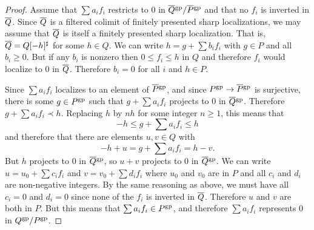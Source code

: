 \documentclass[10pt]{article}
\numberwithin{equation}{section}
\theoremstyle{definition}
\theoremstyle{remark}
\renewcommand{\bar}[1]{\overnorm{#1}\vphantom{#1}}
\def\overnorm#1{\overline{#1}\vphantom{#1}}
\begin{document}
\begin{proof}
	Assume that $\sum a_i f_i$ restricts to $0$ in $\bar Q^{\rm gp} / \bar P^{\rm gp}$ and that no $f_i$ is inverted in $\bar Q$.  Since $\bar Q$ is a filtered colimit of finitely presented sharp localizations, we may assume that $\bar Q$ is itself a finitely presented sharp localization.  That is, $\bar Q = Q[-h]^\sharp$ for some $h \in Q$.  We can write $h = g + \sum b_i f_i$ with $g \in P$ and all $b_i \geq 0$.  But if any $b_i$ is nonzero then $0 \leq f_i \leq h$ in $Q$ and therefore $f_i$ would localize to $0$ in $\bar Q$.  Therefore $b_i = 0$ for all $i$ and $h \in P$.

	Since $\sum a_i f_i$ localizes to an element of $\bar P^{\rm gp}$, and since $P^{\rm gp} \to \bar P^{\rm gp}$ is surjective, there is some $g \in P^{\rm gp}$ such that $g + \sum a_i f_i$ projects to $0$ in $\bar Q^{\rm gp}$.  Therefore $g + \sum a_i f_i \prec h$.  Replacing $h$ by $nh$ for some integer $n \geq 1$, this means that
	\begin{equation*}
		-h \leq g + \sum a_i f_i \leq h
	\end{equation*}
	and therefore that there are elements $u, v \in Q$ with
	\begin{equation*}
		-h + u = g + \sum a_i f_i = h - v .
	\end{equation*}
	But $h$ projects to $0$ in $\bar Q^{\rm gp}$, so $u + v$ projects to $0$ in $\bar Q^{\rm gp}$.  We can write $u = u_0 + \sum c_i f_i$ and $v = v_0 + \sum d_i f_i$ where $u_0$ and $v_0$ are in $P$ and all $c_i$ and $d_i$ are non-negative integers.  By the same reasoning as above, we must have all $c_i = 0$ and $d_i = 0$ since none of the $f_i$ is inverted in $\bar Q$.  Therefore $u$ and $v$ are both in $P$.  But this means that $\sum a_i f_i \in P^{\rm gp}$, and therefore $\sum a_i f_i$ represents $0$ in $Q^{\rm gp} / P^{\rm gp}$.
\end{proof}
\end{document}
